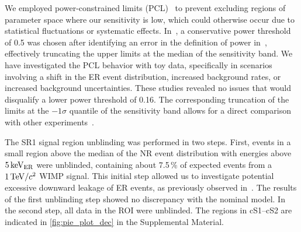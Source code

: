 \documentclass[
    reprint,
    superscriptaddress,
    aps, prl,
    amsmath,amssymb,
    twocolumn,
    showkeys,
    floatfix,
    nofootinbib,
]{revtex4-2}
\begin{document}
We employed power-constrained limits (PCL)~\cite{Cowan:2011an,Baxter:2021pqo} to prevent excluding regions of parameter space where our sensitivity is low, which could otherwise occur due to statistical fluctuations or systematic effects.
In~\cite{XENON:2023wimp}, a conservative power threshold of 0.5 was chosen after identifying an error in the definition of power in~\cite{Baxter:2021pqo}, effectively truncating the upper limits at the median of the sensitivity band.
We have investigated the PCL behavior with toy data, specifically in scenarios involving a shift in the ER event distribution, increased background rates, or increased background uncertainties.
These studies revealed no issues that would disqualify a lower power threshold of 0.16.
The corresponding truncation of the limits at the $-1\sigma$ quantile of the sensitivity band allows for a direct comparison with other experiments~\cite{PandaX:2025_wimp_search,LZ:2025_wimp}.

The SR1 signal region unblinding was performed in two steps.
First, events in a small region above the median of the NR event distribution with energies above $5\,\mathrm{keV_{ER}}$ were unblinded, containing about 7.5\,\% of expected events from a $1\,\mathrm{TeV}/c^2$ WIMP signal.
This initial step allowed us to investigate potential excessive downward leakage of ER events, as previously observed in~\cite{XENON:2023wimp}.
The results of the first unblinding step showed no discrepancy with the nominal model.
In the second step, all data in the ROI were unblinded.
The regions in cS1--cS2 are indicated in \cref{fig:pie_plot_dec} in the Supplemental Material.
\end{document}
